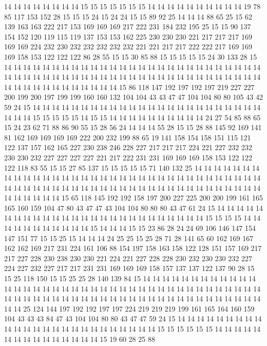 14 14 14 14 14 14 14 14 15 15 15 15 15 15 15 14 14 14 14 14
14 14 14 14 14 19 78 85 117 153 152 28 15 15 15 24 15 24 24 15
15 89 92 25 14 14 14 88 65 25 15 62 139 163 163 222 217 153 169 169
169 217 222 231 184 232 195 25 15 15 90 137 154 152 120 119 115 119 137 153
153 162 225 230 230 230 221 217 217 217 169 169 169 224 232 230 232 232 232 232
232 221 221 217 217 222 222 217 169 169 169 158 153 122 122 122 86 28 55 15
15 30 85 88 15 15 15 15 15 24 30 133 28 15 14 14 14 14 14 14
14 14 14 14 14 14 14 14 14 14 14 14 14 14 14 14 14 14 14 14
14 14 14 14 14 14 14 14 14 14 14 14 14 14 14 14 14 14 14 14
14 14 14 14 14 14 14 14 14 14 14 14 14 14 14 14 14 14 14 14
15 86 118 147 192 197 192 197 219 227 227 200 199 200 197 199 199 160 160 132
104 104 43 43 47 47 104 104 80 80 105 43 42 59 24 15 14 14 14 14
14 14 14 14 14 14 14 14 14 14 14 14 14 14 14 14 14 14 14 14
14 14 14 15 15 15 15 15 14 15 15 14 14 14 14 14 14 14 14 14
14 24 27 54 85 88 65 15 24 23 62 71 88 86 90 55 15 28 56 24
14 14 14 55 28 15 15 28 88 145 92 169 141 81 162 169 169 169 169 222
200 232 199 88 65 19 141 158 154 158 151 115 121 122 137 157 162 165 227 230
238 246 228 227 217 217 217 224 221 227 232 232 230 230 232 227 227 227 227 221
217 222 231 231 169 169 169 158 153 122 122 122 118 83 55 15 15 27 85 137
15 15 15 15 15 71 140 132 25 14 14 14 14 14 14 14 14 14 14 14
14 14 14 14 14 14 14 14 14 14 14 14 14 14 14 14 14 14 14 14
14 14 14 14 14 14 14 14 14 14 14 14 14 14 14 14 14 14 14 14
14 14 14 14 14 14 14 14 14 14 14 14 14 14 14 14 15 65 118 145
192 192 158 197 200 227 225 200 200 199 161 165 165 160 159 104 47 80 43 47
47 43 104 104 80 80 80 43 47 61 24 15 14 14 14 14 14 14 14 14
14 14 14 14 14 14 14 14 14 14 14 14 14 14 14 14 14 14 15 15
15 15 14 14 14 14 14 14 14 14 14 14 14 15 14 14 14 15 15 23
86 28 24 24 69 106 146 147 154 147 151 77 15 15 25 15 14 14 14 24
25 25 15 25 28 71 28 141 65 60 162 169 167 162 162 169 217 231 224 161
106 88 154 197 158 163 158 122 128 151 157 169 217 217 227 228 230 238 230 230
221 224 221 227 228 228 230 232 230 230 232 227 224 227 232 227 217 217 231 231
169 169 169 158 157 137 137 122 137 90 28 15 15 25 118 150 15 15 25 25
28 140 139 84 15 14 14 14 14 14 14 14 14 14 14 14 14 14 14 14
14 14 14 14 14 14 14 14 14 14 14 14 14 14 14 14 14 14 14 14
14 14 14 14 14 14 14 14 14 14 14 14 14 14 14 14 14 14 14 14
14 14 14 14 14 14 14 14 14 14 14 14 14 25 124 144 197 192 192 197
197 224 219 219 219 199 161 165 164 160 159 104 43 43 43 84 47 43 104 104
80 80 43 47 47 59 24 15 14 14 14 14 14 14 14 14 14 14 14 14
14 14 14 14 14 14 14 14 14 14 14 14 14 15 15 15 15 15 15 14
14 14 14 14 14 14 14 14 14 14 14 14 14 14 15 19 60 28 25 88
